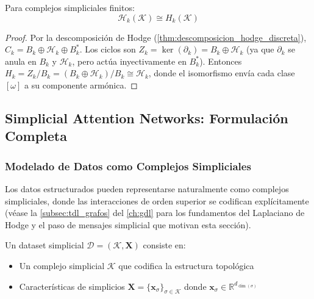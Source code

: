\begin{theorem}\label{thm:isomorfismo_harmonico_homologia}
Para complejos simpliciales finitos:
\begin{equation}
    \mathcal{H}_k(\mathcal{K}) \cong H_k(\mathcal{K})
\end{equation}
\end{theorem}

\begin{proof}
Por la descomposición de Hodge (\autoref{thm:descomposicion_hodge_discreta}), $C_k = B_k \oplus \mathcal{H}_k \oplus B_k^*$. Los ciclos son $Z_k = \ker(\partial_k) = B_k \oplus \mathcal{H}_k$ (ya que $\partial_k$ se anula en $B_k$ y $\mathcal{H}_k$, pero actúa inyectivamente en $B_k^*$). Entonces $H_k = Z_k / B_k = (B_k \oplus \mathcal{H}_k) / B_k \cong \mathcal{H}_k$, donde el isomorfismo envía cada clase $[\omega]$ a su componente armónica.
\end{proof}

\subsection{Simplicial Attention Networks: Formulación Completa}

\subsubsection{Modelado de Datos como Complejos Simpliciales}

Los datos estructurados pueden representarse naturalmente como complejos simpliciales, donde las interacciones de orden superior se codifican explícitamente (véase la \autoref{subsec:tdl_grafos} del \autoref{ch:gdl} para los fundamentos del Laplaciano de Hodge y el paso de mensajes simplicial que motivan esta sección).

\begin{definition}\label{def:dataset_simplicial}
Un dataset simplicial $\mathcal{D} = (\mathcal{K}, \mathbf{X})$ consiste en:
\begin{itemize}
    \item Un complejo simplicial $\mathcal{K}$ que codifica la estructura topológica
    \item Características de simplicios $\mathbf{X} = \{\mathbf{x}_{\sigma}\}_{\sigma \in \mathcal{K}}$ donde $\mathbf{x}_{\sigma} \in \mathbb{R}^{d_{\dim(\sigma)}}$
\end{itemize}
\end{definition}

